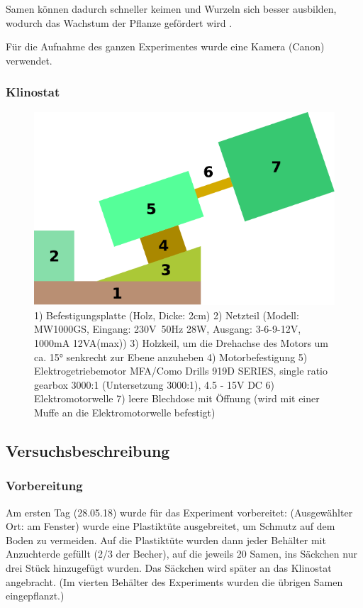 \documentclass[
11pt, 
ngerman,
listof=totocnumbered,
oneside,
bibliography=totocnumbered,
abstracton
]{scrreprt}
\begin{document}
Samen können dadurch schneller keimen und Wurzeln sich besser ausbilden, wodurch das Wachstum der Pflanze gefördert wird \parencite{Windhager}. 

Für die Aufnahme des ganzen Experimentes wurde eine Kamera (Canon) verwendet.


\subsubsection{Klinostat}

 \begin{figure}[H]
 	\centering 
 	\includegraphics[width = 0.5\linewidth]{images/drawing-1.pdf}
 	\caption{1) Befestigungsplatte (Holz, Dicke: 2cm) 2) Netzteil (Modell: MW1000GS, Eingang: 230V~50Hz 28W, Ausgang: 3-6-9-12V, 1000mA 12VA(max)) 3) Holzkeil, um die Drehachse des Motors um ca. \ang{15} senkrecht zur Ebene anzuheben 4) Motorbefestigung 5) Elektrogetriebemotor MFA/Como Drills 919D SERIES, single ratio gearbox 3000:1 (Untersetzung 3000:1), 4.5 - 15V DC	6) Elektromotorwelle 7) leere Blechdose mit Öffnung (wird mit einer Muffe an die Elektromotorwelle befestigt)}
 \end{figure} 

\subsection{Versuchsbeschreibung}

\subsubsection{Vorbereitung}

Am ersten Tag (28.05.18) wurde für das Experiment vorbereitet: (Ausgewählter Ort: am Fenster) wurde eine Plastiktüte ausgebreitet, um Schmutz auf dem Boden zu vermeiden. Auf die Plastiktüte wurden dann jeder Behälter mit Anzuchterde gefüllt (2/3 der Becher), auf die jeweils 20 Samen, ins Säckchen  nur drei Stück hinzugefügt wurden. Das Säckchen wird später an das Klinostat angebracht. (Im vierten Behälter des Experiments wurden die übrigen Samen eingepflanzt.)
\end{document}

